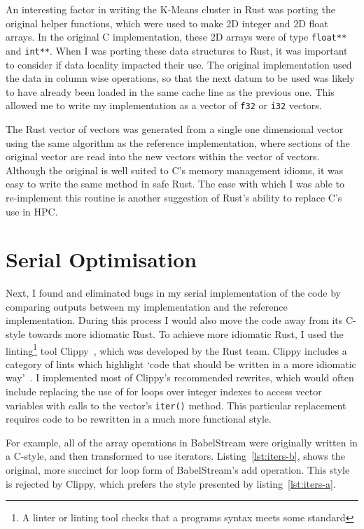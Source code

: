 An interesting factor in writing the K-Means cluster in Rust was porting the original helper functions, which were used to make 2D integer and 2D float arrays. In the original C implementation, these 2D arrays were of type \texttt{float**} and \texttt{int**}.
When I was porting these data structures to Rust, it was important to consider if data locality impacted their use. The original implementation used the data in column wise operations, so that the next datum to be used was likely to have already been loaded in the same cache line as the previous one. This allowed me to write my implementation as a vector of \texttt{f32} or \texttt{i32} vectors.

The Rust vector of vectors was generated from a single one dimensional vector using the same algorithm as the reference implementation, where sections of the original vector are read into the new vectors within the vector of vectors. Although the original is well suited to C's memory management idioms, it was easy to write the same method in safe Rust. The ease with which I was able to re-implement this routine is another suggestion of Rust's ability to replace C's use in HPC.

\section{Serial Optimisation}
Next, I found and eliminated bugs in my serial implementation of the code by comparing outputs between my implementation and the reference implementation. During this process I would also move the code away from its C-style towards more idiomatic Rust. To achieve more idiomatic Rust, I used the linting\footnote{A linter or linting tool checks that a programs syntax meets some standard} tool Clippy~\cite{RustClippy}, which was developed by the Rust team.  Clippy includes a category of lints  which highlight `code that should be written in a more idiomatic way'~\cite{RustClippy}. I implemented most of Clippy's recommended rewrites, which would often include replacing the use of for loops over integer indexes to access vector variables with calls to the vector's \texttt{iter()} method. This particular replacement requires code to be rewritten in a much more functional style.

For example, all of the array operations in BabelStream were originally written in a C-style, and then transformed to use iterators. Listing~\ref{lst:iters-b}, shows the original, more succinct for loop form of BabelStream's add operation. This style is rejected by Clippy, which prefers the style presented by listing~\ref{lst:iters-a}.

